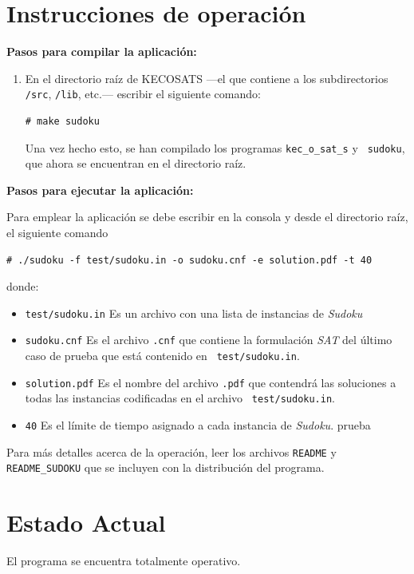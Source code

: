 \documentclass[12pt,lettersize,oneside]{article}
\begin{document}
\section{Instrucciones de operación}

\textbf{Pasos para compilar la aplicación:}
\begin{enumerate}
\item En el directorio raíz de KECOSATS ---el que contiene a los subdirectorios
  {\tt /src}, {\tt /lib}, etc.--- escribir el siguiente comando:
\begin{lstlisting}[style=consola]
# make sudoku
\end{lstlisting}

Una vez hecho esto, se han compilado los programas {\tt kec\_o\_sat\_s} y {\tt
  sudoku}, que ahora se encuentran en el directorio raíz.

\end{enumerate}

\textbf{Pasos para ejecutar la aplicación:}

Para emplear la aplicación se debe escribir en la consola y desde el directorio
raíz, el siguiente comando
\begin{lstlisting}[style=consola2]
# ./sudoku -f test/sudoku.in -o sudoku.cnf -e solution.pdf -t 40
\end{lstlisting}
donde:\vspace{-2.5mm}
\begin{itemize}
\item {\tt test/sudoku.in} Es un archivo con una lista de instancias de
  \emph{Sudoku}
\item {\tt sudoku.cnf} Es el archivo {\tt .cnf} que contiene la formulación
  \emph{SAT} del último caso de prueba que está contenido en {\tt
    test/sudoku.in}.
\item {\tt solution.pdf} Es el nombre del archivo {\tt .pdf} que contendrá las
  soluciones a todas las instancias codificadas en el archivo {\tt
    test/sudoku.in}.
\item{\tt 40} Es el límite de tiempo asignado a cada instancia de \emph{Sudoku}.
  prueba 
\end{itemize}

Para más detalles acerca de la operación, leer los archivos {\tt README} y {\tt
  README\_SUDOKU} que se incluyen con la distribución del programa.
\section{Estado Actual}
El programa se encuentra totalmente operativo.
\end{document}

